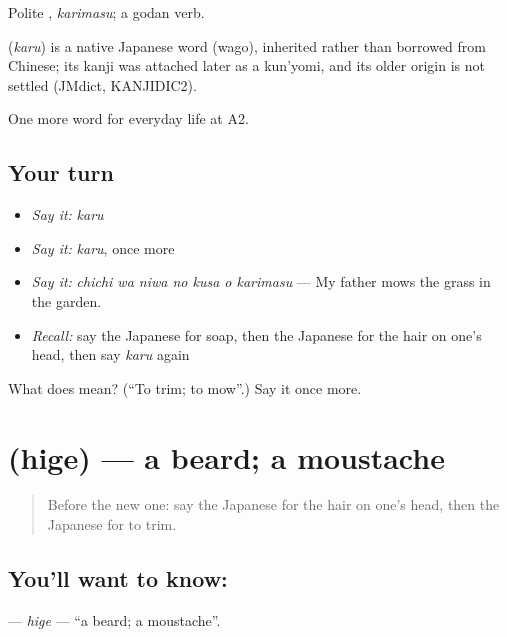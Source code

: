 Polite \textbf{}, \emph{karimasu}; a godan verb.

\begin{cousinweb}
\textbf{} (\emph{karu}) is a native Japanese word (wago), inherited rather than borrowed from Chinese; its kanji was attached later as a kun'yomi, and its older origin is not settled (JMdict, KANJIDIC2).
\end{cousinweb}

\begin{grammarlens}[title={What you've built}]
One more word for everyday life at A2.
\end{grammarlens}

\subsection*{Your turn}
\begin{itemize}
\raggedright
  \item \emph{Say it:} \emph{karu}
  \item \emph{Say it:} \emph{karu}, once more
  \item \emph{Say it:} \emph{chichi wa niwa no kusa o karimasu} — My father mows the grass in the garden.
  \item \emph{Recall:} say the Japanese for soap, then the Japanese for the hair on one's head, then say \emph{karu} again
\end{itemize}

\begin{tcolorbox}[breakable,colback=teal!4,colframe=teal!35!black,title={Before you move on}]
What does  mean? (\textquotedblleft{}To trim; to mow\textquotedblright{}.) Say it once more.
\end{tcolorbox}
\section[\texorpdfstring{\ja{ひげ} (hige)}{ひげ (hige)}]{ (hige) — a beard; a moustache}

\label{lesson:JA-C148-hige}



\begin{quote}
Before the new one: say the Japanese for the hair on one's head, then the Japanese for to trim.
\end{quote}

\subsection*{You'll want to know: }
\textbf{} — \emph{hige} — \textquotedblleft{}a beard; a moustache\textquotedblright{}.

